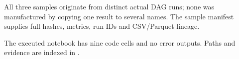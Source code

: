 All three samples originate from distinct actual DAG runs; none was manufactured by copying one result to several names. The sample manifest supplies full hashes, metrics, run IDs and CSV/Parquet lineage.

The executed notebook has nine code cells and no error outputs. Paths and evidence are indexed in .

